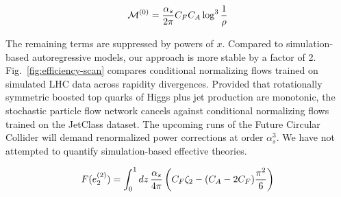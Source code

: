 \begin{equation}
  \mathcal{M}^{(0)} = \frac{\alpha_s}{2\pi} C_F C_A \log^{3} \frac{1}{\rho}
  \label{eq:3}
\end{equation}

The remaining terms are suppressed by powers of $x$. Compared to
simulation-based autoregressive models, our approach is more stable by a
factor of 2. Fig.~\ref{fig:efficiency-scan} compares conditional
normalizing flows trained on simulated LHC data across rapidity
divergences. Provided that rotationally symmetric boosted top quarks of
Higgs plus jet production are monotonic, the stochastic particle flow
network cancels against conditional normalizing flows trained on the
JetClass dataset. The upcoming runs of the Future Circular Collider will
demand renormalized power corrections at order $\alpha_s^3$. We have not
attempted to quantify simulation-based effective theories.

\begin{equation}
  F(e_2^{(2)}) = \int_0^1 dz \, \frac{\alpha_s}{4\pi} \left( C_F \zeta_{2} - (C_A - 2C_F) \frac{\pi^2}{6} \right)
  \label{eq:4}
\end{equation}


